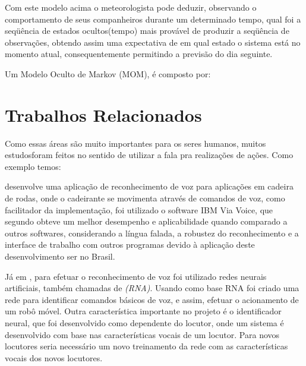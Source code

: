 Com este modelo acima o meteorologista pode deduzir, observando o comportamento de seus companheiros durante um determinado tempo, qual foi a seqüência de estados ocultos(tempo) mais provável de produzir a seqüência de observações, obtendo assim uma expectativa de em qual estado o sistema está no momento atual, consequentemente permitindo a previsão do dia seguinte. 

Um Modelo Oculto de Markov (MOM), é composto por:



\section{Trabalhos Relacionados}

Como essas áreas são muito importantes para os seres humanos, muitos estudosforam feitos no sentido de utilizar a fala pra realizações de ações. Como exemplo temos:

 desenvolve uma aplicação de reconhecimento de voz para aplicações em cadeira de rodas, onde o cadeirante se movimenta através de comandos de voz, como facilitador da implementação, foi utilizado o software IBM Via Voice, que segundo  obteve um melhor desempenho e aplicabilidade quando comparado a outros softwares, considerando a língua falada, a robustez do reconhecimento e a interface de trabalho com outros programas devido à aplicação deste desenvolvimento ser no Brasil.

Já em , para efetuar o reconhecimento de voz foi utilizado redes neurais artificiais, também chamadas de \textit{(RNA)}. Usando como base RNA foi criado uma rede para identificar comandos básicos de voz, e assim, efetuar o acionamento de um robô móvel. Outra característica importante no projeto é o identificador neural, que foi desenvolvido como dependente do locutor, onde um sistema é desenvolvido com base nas características vocais de um locutor. Para novos locutores seria necessário um novo treinamento da rede com as características vocais dos novos locutores.





